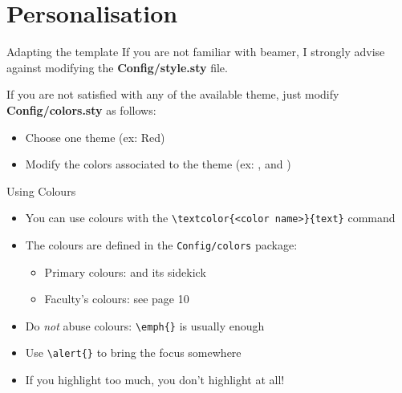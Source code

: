 \section{Personalisation} \label{Themes}





\begin{frame}{Adapting the template}
    If you are not familiar with beamer, I strongly advise against modifying the \textbf{Config/style.sty} file.
    
    \vspace{\baselineskip}
    
    If you are not satisfied with any of the available theme, just modify \textbf{Config/colors.sty} as follows:
    \begin{itemize}
        \item Choose one theme (ex: Red)
        \item Modify the colors associated to the theme (ex: \testcolor{\useMainColor}, \testcolor{\useBlockTitleColor} and \testcolor{\useBlockMainColor})
    \end{itemize}
\end{frame}



\begin{frame}[fragile]{Using Colours}
\begin{itemize}[<alert@2>]
  \item You can use colours with the
        \verb|\textcolor{<color name>}{text}| command
  \item The colours are defined in the \texttt{Config/colors} package:
  \begin{itemize}
  \item Primary colours:  and its sidekick 
  \item Faculty's colours: see page 10
  \end{itemize}
  \item Do \emph{not} abuse colours: \verb|\emph{}| is usually enough
  \item Use \verb|\alert{}| to bring the \alert<3->{focus} somewhere
  \item <3- | alert@3> If you highlight too much, you don't highlight at all!
\end{itemize}
\end{frame}

